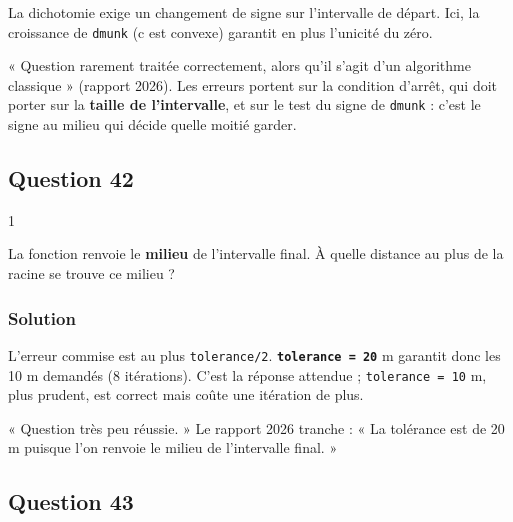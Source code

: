 \documentclass[11pt,a4paper]{article}
\begin{document}
\begin{methode}

La dichotomie exige un changement de signe sur l'intervalle de départ. Ici, la croissance de \texttt{dmunk} (c est convexe) garantit en plus l'unicité du zéro.

\end{methode}

\begin{piege}

« Question rarement traitée correctement, alors qu'il s'agit d'un algorithme classique » (rapport 2026). Les erreurs portent sur la condition d'arrêt, qui doit porter sur la \textbf{taille de l'intervalle}, et sur le test du signe de \texttt{dmunk} : c'est le signe au milieu qui décide quelle moitié garder.

\end{piege}

\hypertarget{question-42}{%
\subsection{Question 42}\label{question-42}}

\begin{indication}{1}

La fonction renvoie le \textbf{milieu} de l'intervalle final. À quelle distance au plus de la racine se trouve ce milieu ?

\end{indication}

\hypertarget{solution-41}{%
\subsubsection{Solution}\label{solution-41}}

L'erreur commise est au plus \texttt{tolerance/2}. \textbf{\texttt{tolerance\ =\ 20}} m garantit donc les 10 m demandés (8 itérations). C'est la réponse attendue ; \texttt{tolerance\ =\ 10} m, plus prudent, est correct mais coûte une itération de plus.

\begin{jury}

« Question très peu réussie. » Le rapport 2026 tranche : « La tolérance est de 20 m puisque l'on renvoie le milieu de l'intervalle final. »

\end{jury}

\hypertarget{question-43}{%
\subsection{Question 43}\label{question-43}}
\end{document}
